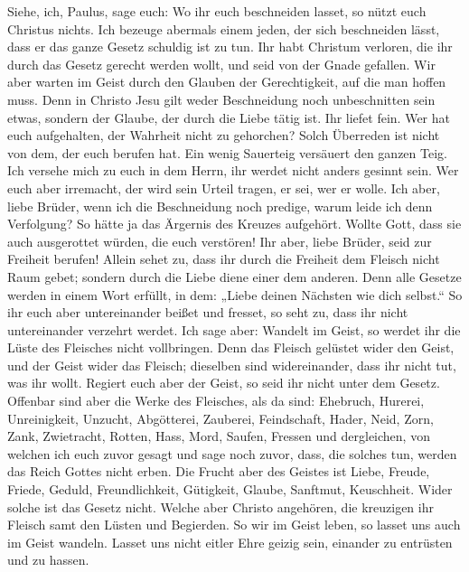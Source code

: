  Siehe, ich, Paulus, sage euch: Wo ihr euch beschneiden
lasset, so nützt euch Christus nichts.  Ich bezeuge
abermals einem jeden, der sich beschneiden lässt, dass er das ganze
Gesetz schuldig ist zu tun.  Ihr habt Christum verloren,
die ihr durch das Gesetz gerecht werden wollt, und seid von der Gnade
gefallen.  Wir aber warten im Geist durch den Glauben der
Gerechtigkeit, auf die man hoffen muss.  Denn in Christo
Jesu gilt weder Beschneidung noch unbeschnitten sein etwas, sondern der
Glaube, der durch die Liebe tätig ist.  Ihr liefet fein.
Wer hat euch aufgehalten, der Wahrheit nicht zu gehorchen?
 Solch Überreden ist nicht von dem, der euch berufen hat.
 Ein wenig Sauerteig versäuert den ganzen Teig.
 Ich versehe mich zu euch in dem Herrn, ihr werdet nicht
anders gesinnt sein. Wer euch aber irremacht, der wird sein Urteil
tragen, er sei, wer er wolle.  Ich aber, liebe Brüder,
wenn ich die Beschneidung noch predige, warum leide ich denn Verfolgung?
So hätte ja das Ärgernis des Kreuzes aufgehört.  Wollte
Gott, dass sie auch ausgerottet würden, die euch verstören!
 Ihr aber, liebe Brüder, seid zur Freiheit berufen!
Allein sehet zu, dass ihr durch die Freiheit dem Fleisch nicht Raum
gebet; sondern durch die Liebe diene einer dem anderen. 
Denn alle Gesetze werden in einem Wort erfüllt, in dem: „Liebe deinen
Nächsten wie dich selbst.``  So ihr euch aber
untereinander beißet und fresset, so seht zu, dass ihr nicht
untereinander verzehrt werdet.  Ich sage aber: Wandelt im
Geist, so werdet ihr die Lüste des Fleisches nicht vollbringen.
 Denn das Fleisch gelüstet wider den Geist, und der Geist
wider das Fleisch; dieselben sind widereinander, dass ihr nicht tut, was
ihr wollt.  Regiert euch aber der Geist, so seid ihr
nicht unter dem Gesetz.  Offenbar sind aber die Werke des
Fleisches, als da sind: Ehebruch, Hurerei, Unreinigkeit, Unzucht,
 Abgötterei, Zauberei, Feindschaft, Hader, Neid, Zorn,
Zank, Zwietracht, Rotten, Hass, Mord,  Saufen, Fressen
und dergleichen, von welchen ich euch zuvor gesagt und sage noch zuvor,
dass, die solches tun, werden das Reich Gottes nicht erben.
 Die Frucht aber des Geistes ist Liebe, Freude, Friede,
Geduld, Freundlichkeit, Gütigkeit, Glaube, Sanftmut, Keuschheit.
 Wider solche ist das Gesetz nicht. 
Welche aber Christo angehören, die kreuzigen ihr Fleisch samt den Lüsten
und Begierden.  So wir im Geist leben, so lasset uns auch
im Geist wandeln.  Lasset uns nicht eitler Ehre geizig
sein, einander zu entrüsten und zu hassen.

